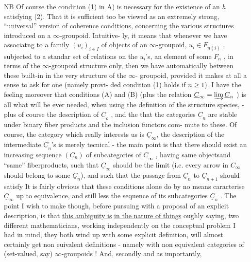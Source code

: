 NB  Of course the condition (1) in A) is necessary for the existence
\margin{$\|$}of an $h$ satisfying (2).  That it is sufficient too  be viewed as an
extremely strong, ``universal'' version of coherence conditions,
concerning the various structures introduced on a $\infty$-groupoid. Intuitive-%
ly,  it means that whenever we have  associatng to a  family 
$(u_i)_{i\in I}$  of objects of an $\infty$-groupoid,  $u_i \in F_{n(i)}$ ,   subjected
to a standar set of relations on the $u_i$'s, an element of some $F_n$ ,  in
terms of the $\infty$-groupoid structure only,  then we have automatically
 between these built-in in the very structure of the $\infty$-%
groupoid,  provided it makes at all a sense to ask for one (namely provi-%
ded condition (1) holds if $n \geq 1$).   I have the feeling moreover that
conditions (A) and (B) (plus the relation $\underline{C}_\infty = \varinjlim \underline{C}_n$ ) is all what will
be ever needed,  when using the definition of the structure species,
- plus of course the description of $\underline{C}_o$ , and the   that the categories
$\underline{C}_n$ are stable under binary fiber products and the inclusion functors com-%
mute to these. Of course,  the category which really interests us is
$\underline{C}_\infty$,  the description of the intermediate $\underline{C}_n$'s\hand{$|$} is merely tecnical  -
the main point is that there should exist an increasing sequence $(C_n)$ of
subcategories of $\underline{C}_\infty$ ,  having same objects\over{,}{(}and ``same'' fiberproducts\over{,}{)},
such that $\underline{C}_\infty$ should be the limit (i.e. every arrow in $C_\infty$ should belong 
to some $\underline{C}_n$),  and such that the passage from $\underline{C}_n$ to $\underline{C}_{n+1}$ should satisfy 
 \hand{$\ulcorner$}It is fairly obvious that these conditions alone do by no means
caracterise $\underline{C}_\infty$  up to equivalence,  and still less the sequence of its
subcategories $\underline{C}_n$ .  The point I wish to make though,  before pursuing
with a proposal of an explicit description,  is  that \uline{this ambiguity is}
\uline{in the nature of things} oughly saying, two different mathematicians,
working independently on the conceptual problem I had in mind,  
they both wind up with some explicit definition,  will almost certainly
get non euivalent definitions  -  namely with non equivalent categories
of (set-valued, say) $\infty$-groupoids !  And, secondly and as importantly,

